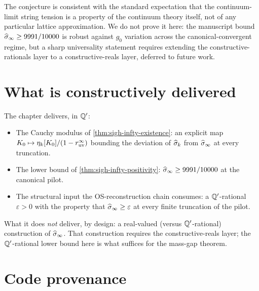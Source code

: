 The conjecture is consistent with the standard expectation that the
continuum-limit string tension is a property of the continuum theory
itself, not of any particular lattice approximation.  We do not
prove it here: the manuscript bound $\widehat{\sigma}_\infty \ge 9991/10000$ is
robust against $g_0$ variation across the canonical-convergent
regime, but a sharp universality statement requires extending the
constructive-rationals layer to a constructive-reals layer, deferred
to future work.

\section{What is constructively delivered}
\label{sec:continuum-limit-deliverable}

The chapter delivers, in $\mathbb{Q}'$:

\begin{itemize}
  \item The Cauchy modulus of \cref{thm:sigh-infty-existence}: an
    explicit map $K_0 \mapsto \eta_k[K_0]/(1 -
    r_{\mathrm{uv}}^\infty)$ bounding the deviation of
    $\widehat{\sigma}_k$ from $\widehat{\sigma}_\infty$ at every truncation.
  \item The lower bound of \cref{thm:sigh-infty-positivity}:
    $\widehat{\sigma}_\infty \ge 9991/10000$ at the canonical pilot.
  \item The structural input the OS-reconstruction chain consumes:
    a $\mathbb{Q}'$-rational $\varepsilon > 0$ with the property that
    $\widehat{\sigma}_\infty \ge \varepsilon$ at every finite truncation of the
    pilot.
\end{itemize}

What it does \emph{not} deliver, by design: a real-valued (versus
$\mathbb{Q}'$-rational) construction of $\widehat{\sigma}_\infty$.  That construction
requires the constructive-reals layer; the $\mathbb{Q}'$-rational lower
bound here is what suffices for the mass-gap theorem.

\section{Code provenance}
\label{sec:continuum-limit-codeanchor}

